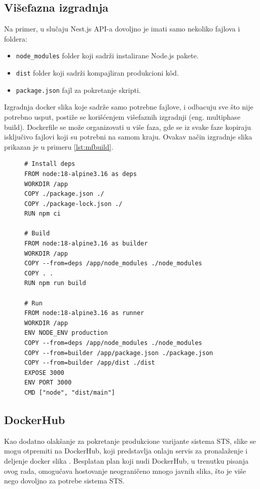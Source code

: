 \documentclass[12pt,oneside]{memoir}
\begin{document}
\subsection{Višefazna izgradnja}
Na primer, u slučaju Nest.js API-a dovoljno je imati samo nekoliko fajlova i foldera: 
\begin{itemize}
    \item \verb|node_modules| folder koji sadrži instalirane Node.js pakete.
    \item \verb|dist| folder koji sadrži kompajliran produkcioni k\^{o}d.
    \item \verb|package.json| fajl za pokretanje skripti.
\end{itemize}

Izgradnja docker slika koje sadrže samo potrebne fajlove, i odbacuju sve što nije potrebno usput, postiže se korišćenjem višefaznih izgradnji (eng. multiphase build). Dockerfile se može organizovati u više faza, gde se iz svake faze kopiraju isključivo fajlovi koji su potrebni na samom kraju. Ovakav način izgradnje slika prikazan je u primeru \ref{lst:mfbuild}.

\begin{figure}[h]
\begin{lstlisting}[language=docker, caption={Višefazna izgradnja slike za API servis.}, label={lst:mfbuild}]
# Install deps
FROM node:18-alpine3.16 as deps
WORKDIR /app
COPY ./package.json ./
COPY ./package-lock.json ./
RUN npm ci

# Build
FROM node:18-alpine3.16 as builder
WORKDIR /app
COPY --from=deps /app/node_modules ./node_modules
COPY . .
RUN npm run build

# Run
FROM node:18-alpine3.16 as runner
WORKDIR /app
ENV NODE_ENV production
COPY --from=deps /app/node_modules ./node_modules
COPY --from=builder /app/package.json ./package.json
COPY --from=builder /app/dist ./dist
EXPOSE 3000
ENV PORT 3000
CMD ["node", "dist/main"]
\end{lstlisting}
\end{figure}

\newpage
\subsection{DockerHub}

Kao dodatno olakšanje za pokretanje produkcione varijante sistema STS, slike se mogu otpremiti na DockerHub, koji predstavlja onlajn servis za pronalaženje i deljenje docker slika \cite{dockerhubdocs}. Besplatan plan koji nudi DockerHub, u trenutku pisanja ovog rada, omogućava hostovanje neograničeno mnogo javnih slika, što je više nego dovoljno za potrebe sistema STS. 
\end{document}
